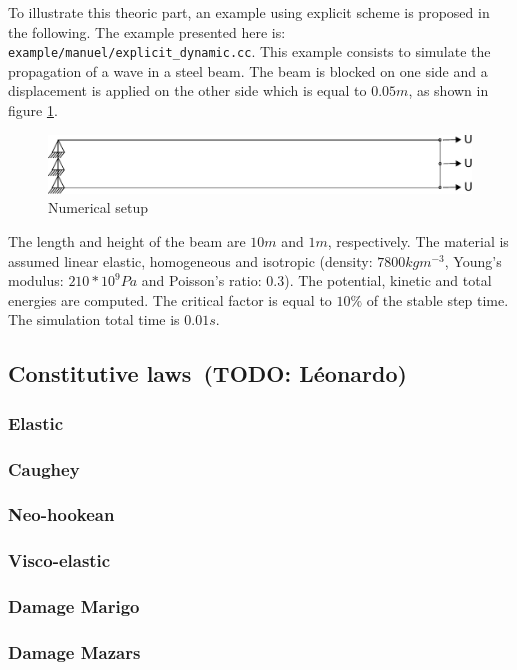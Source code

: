\documentclass[a4paper,11pt]{book}
\newcommand{\code}[1]{\texttt{#1}}
\newcommand{\todo}[1]{~({\small\color{red}\textbf{TODO: }\textbf{#1}})}
\begin{document}
To illustrate this theoric part, an example using explicit scheme is proposed in the 
following.
The example presented here is: \code{example/manuel/explicit\_dynamic.cc}.
This example consists to simulate the propagation of a wave in a steel beam. The beam 
is blocked on one side and a displacement is applied on the other side which is equal 
to $0.05m$, as shown in figure \ref{fig:smm:explicit}. 

\begin{figure}[!htb]
  \centering
  \includegraphics[scale=.6]{figures/explicit_dynamic}
  \caption{Numerical setup \label{fig:smm:explicit}}
\end{figure}

The length and height of the beam are $10m$ and $1m$, respectively. The material is 
assumed linear elastic, homogeneous and isotropic (density: $7800kgm^{-3}$, Young's 
modulus: $210*10^{9}Pa$ and Poisson's ratio: $0.3$).
The potential, kinetic and total energies are computed. The critical factor is equal to $10\%$ of the stable step time. The simulation total time is $0.01s$.

\subsection{Constitutive laws\todo{L\'eonardo}}
\subsubsection{Elastic}
\subsubsection{Caughey}
\subsubsection{Neo-hookean}
\subsubsection{Visco-elastic}
\subsubsection{Damage Marigo}
\subsubsection{Damage Mazars}
\end{document}
